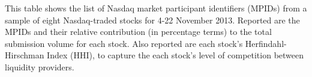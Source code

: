 \documentclass{article}
\begin{document}
\begin{table}[!htbp]
\begin{center}
{\begin{tabular}
\end{tabular}}
\end{center}
\begin{minipage}{\textwidth}
\footnotesize
This table shows the list of Nasdaq market participant identifiers (MPIDs) from a sample of eight Nasdaq-traded stocks for 4-22 November 2013. Reported are the MPIDs and their relative contribution (in percentage terms) to the total submission volume for each stock. Also reported are each stock's Herfindahl-Hirschman Index (HHI), to capture the each stock's level of competition between liquidity providers. %
\end{minipage}
\end{table}
\end{document}
